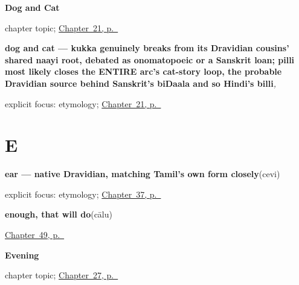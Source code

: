 \noindent\begin{minipage}[t]{\linewidth}
\raggedright
\textbf{Dog and Cat}\par
\footnotesize chapter topic; \hyperref[ch:te-dog-and-cat]{Chapter~21, p.~\pageref*{ch:te-dog-and-cat}}
\end{minipage}\par\smallskip

\noindent\begin{minipage}[t]{\linewidth}
\raggedright
\textbf{dog and cat — kukka genuinely breaks from its Dravidian cousins' shared naayi root, debated as onomatopoeic or a Sanskrit loan; pilli most likely closes the ENTIRE arc's cat-story loop, the probable Dravidian source behind Sanskrit's biDaala and so Hindi's billi}\enspace\emph{, }\par
\footnotesize explicit focus: etymology; \hyperref[ch:te-dog-and-cat]{Chapter~21, p.~\pageref*{ch:te-dog-and-cat}}
\end{minipage}\par\smallskip

\section*{E}

\noindent\begin{minipage}[t]{\linewidth}
\raggedright
\textbf{ear — native Dravidian, matching Tamil's own form closely}\enspace\emph{}\enspace(cevi)\par
\footnotesize explicit focus: etymology; \hyperref[ch:te-face-words]{Chapter~37, p.~\pageref*{ch:te-face-words}}
\end{minipage}\par\smallskip

\noindent\begin{minipage}[t]{\linewidth}
\raggedright
\textbf{enough, that will do}\enspace\emph{}\enspace(cālu)\par
\footnotesize \hyperref[ch:te-replies]{Chapter~49, p.~\pageref*{ch:te-replies}}
\end{minipage}\par\smallskip

\noindent\begin{minipage}[t]{\linewidth}
\raggedright
\textbf{Evening}\par
\footnotesize chapter topic; \hyperref[ch:te-evening]{Chapter~27, p.~\pageref*{ch:te-evening}}
\end{minipage}\par\smallskip

